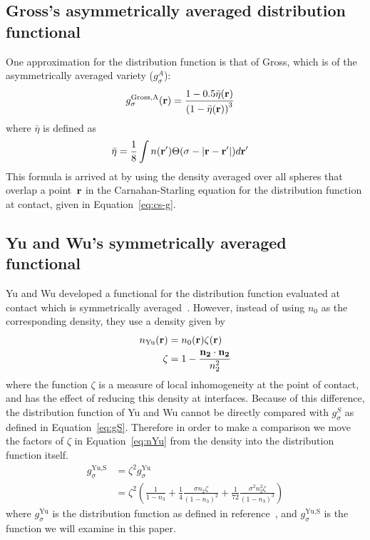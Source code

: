 \subsection{Gross's asymmetrically averaged distribution functional}\label{sec:gross}
One approximation for the distribution function is that of
Gross\cite{gross2009density}, which is of the asymmetrically averaged
variety ($g_\sigma^A$):
\begin{align}
  g_\sigma^\text{Gross,A}(\textbf{r}) &= \frac{1 - 0.5\bar{\eta}(\mathbf{r})}{\left(1 -
    \bar{\eta}(\mathbf{r})\right)^3}
\end{align}
where $\bar{\eta}$ is defined as
\begin{align}
\bar{\eta} &= \frac{1}{8} \int n(\textbf{r}') \Theta(\sigma -\left|\textbf{r} - \textbf{r}'\right|)
  d\textbf{r}'
\end{align}
This formula is arrived at by using the density averaged over all
spheres that overlap a point~$\textbf{r}$ in the
Carnahan-Starling equation for the distribution function at contact,
given in Equation~\ref{eq:cs-g}.

\subsection{Yu and Wu's symmetrically averaged functional}\label{sec:yuwu}

Yu and Wu developed a functional for the distribution function
evaluated at contact which is symmetrically
averaged~\cite{yu2002fmt-dft-inhomogeneous-associating}.  However,
instead of using $n_0$ as the corresponding density, they use a
density given by
\begin{align}
  n_\text{Yu}(\textbf{r}) &= n_0(\textbf{r}) \zeta(\textbf{r}) \label{eq:nYu} \\
  \zeta &= 1 - \frac{\mathbf{n_2}\cdot\mathbf{n_2}}{n_2^2} \label{eq:zeta}
\end{align}
where the function $\zeta$ is a measure of local inhomogeneity at the
point of contact, and has the effect of reducing this density at
interfaces.  Because of this difference, the distribution function of
Yu and Wu cannot be directly compared with $g_\sigma^S$ as defined in
Equation~\ref{eq:gS}.  Therefore in order to make a comparison we move
the factors of $\zeta$ in Equation~\ref{eq:nYu} from the density into
the distribution function itself.
\begin{align}
  g_\sigma^\text{Yu,S} &= \zeta^2 g_\sigma^\text{Yu} \\
   &= \zeta^2\left(\frac{1}{1-n_3}
    + \frac14 \frac{\sigma n_2\zeta}{(1-n_3)^2}
    + \frac1{72} \frac{\sigma^2 n_2^2 \zeta}{(1-n_3)^3}\right)
\end{align}
where $g_\sigma^\text{Yu}$ is the distribution function as defined in
reference~\cite{yu2002fmt-dft-inhomogeneous-associating}, and
$g_\sigma^\text{Yu,S}$ is the function we will examine in this paper.


